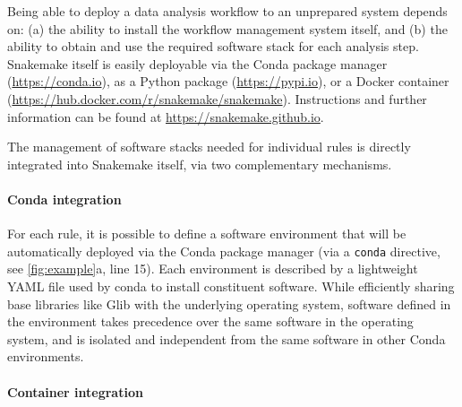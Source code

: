 \documentclass[10pt,a4paper,twocolumn]{article}
\let\plainurl\url
\renewcommand{\url}[1]{\protect\plainurl{#1}}
\begin{document}
Being able to deploy a data analysis workflow to an unprepared system depends on: (a) the ability to install the workflow management system itself, and (b) the ability to obtain and use the required software stack for each analysis step.
Snakemake itself is easily deployable via the Conda package manager (\url{https://conda.io}), as a Python package (\url{https://pypi.io}), or a Docker container (\url{https://hub.docker.com/r/snakemake/snakemake}).
Instructions and further information can be found at \url{https://snakemake.github.io}.

The management of software stacks needed for individual rules is directly integrated into Snakemake itself, via two complementary mechanisms.

\paragraph{Conda integration}

For each rule, it is possible to define a software environment that will be automatically deployed via the Conda package manager (via a \lstinline!conda! directive, see \autoref{fig:example}a, line 15).
Each environment is described by a lightweight YAML file used by conda to install constituent software.
While efficiently sharing base libraries like Glib with the underlying operating system, software defined in the environment takes precedence over the same software in the operating system, and is isolated and independent from the same software in other Conda environments.

\paragraph{Container integration}
\end{document}
